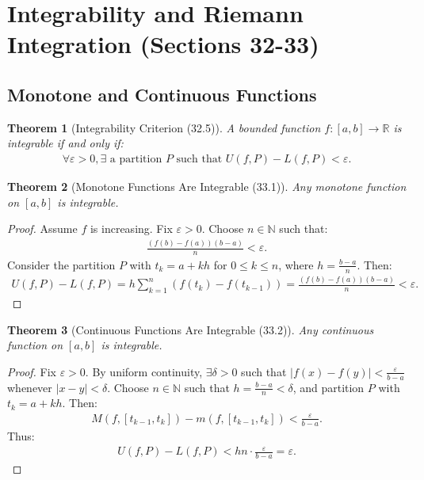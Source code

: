 \documentclass[9pt]{article}
\theoremstyle{definition}
\theoremstyle{plain}
\newtheorem{theorem}{Theorem}
\begin{document}
\section*{Integrability and Riemann Integration (Sections 32-33)}

\subsection*{Monotone and Continuous Functions}
\begin{theorem}[Integrability Criterion (32.5)]
A bounded function $ f : [a, b] \to \mathbb{R} $ is integrable if and only if:
\begin{align}
\forall \varepsilon > 0, \exists \text{ a partition } P \text{ such that } U(f, P) - L(f, P) < \varepsilon.
\end{align}
\end{theorem}

\begin{theorem}[Monotone Functions Are Integrable (33.1)]
Any monotone function on $ [a, b] $ is integrable.
\end{theorem}

\begin{proof}
Assume $ f $ is increasing. Fix $ \varepsilon > 0 $. Choose $ n \in \mathbb{N} $ such that:
\begin{align}
\frac{(f(b) - f(a))(b - a)}{n} < \varepsilon.
\end{align}
Consider the partition $ P $ with $ t_k = a + kh $ for $ 0 \leq k \leq n $, where $ h = \frac{b-a}{n} $. Then:
\begin{align}
U(f, P) - L(f, P) = h \sum_{k=1}^n (f(t_k) - f(t_{k-1})) = \frac{(f(b) - f(a))(b - a)}{n} < \varepsilon.
\end{align}
\end{proof}

\begin{theorem}[Continuous Functions Are Integrable (33.2)]
Any continuous function on $ [a, b] $ is integrable.
\end{theorem}

\begin{proof}
Fix $ \varepsilon > 0 $. By uniform continuity, $ \exists \delta > 0 $ such that $ |f(x) - f(y)| < \frac{\varepsilon}{b-a} $ whenever $ |x - y| < \delta $. Choose $ n \in \mathbb{N} $ such that $ h = \frac{b-a}{n} < \delta $, and partition $ P $ with $ t_k = a + kh $. Then:
\begin{align}
M(f, [t_{k-1}, t_k]) - m(f, [t_{k-1}, t_k]) < \frac{\varepsilon}{b-a}.
\end{align}
Thus:
\begin{align}
U(f, P) - L(f, P) < hn \cdot \frac{\varepsilon}{b-a} = \varepsilon.
\end{align}
\end{proof}
\end{document}
